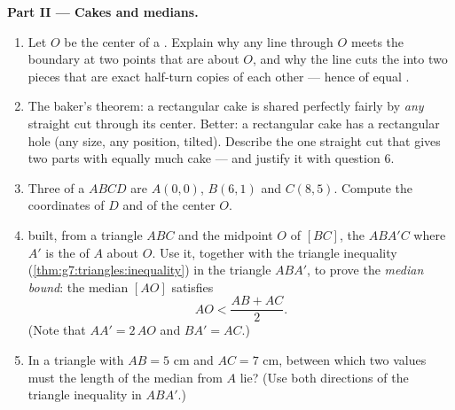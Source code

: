 \begin{problem}
\medskip
\noindent\textbf{Part II --- Cakes and medians.}
\begin{enumerate}[resume]
  \item Let $O$ be the center of a . Explain why
        any line through $O$ meets the boundary at two points
        that are  about $O$, and why the line cuts the
         into two pieces that are exact half-turn
        copies of each other --- hence of equal .
  \item The baker's theorem: a rectangular cake is shared
        perfectly fairly by \emph{any} straight cut through its
        center. Better: a rectangular cake has a rectangular
        hole (any size, any position,  tilted). Describe the
        one straight cut that gives two parts with equally much
        cake --- and justify it with question 6.
  \item Three  of a  $ABCD$ are $A(0, 0)$,
        $B(6, 1)$ and $C(8, 5)$. Compute the coordinates of $D$
        and of the center $O$.
  \item {} built, from a triangle $ABC$
        and the midpoint $O$ of $[BC]$, the 
        $ABA'C$ where $A'$ is the  of $A$ about $O$.
        Use it, together with the triangle inequality
        (\cref{thm:g7:triangles:inequality}) in the triangle
        $ABA'$, to prove the \emph{median bound}: the median
        $[AO]$ satisfies
        \[
        AO < \frac{AB + AC}{2} .
        \]
        (Note that $AA' = 2\,AO$ and $BA' = AC$.)
  \item In a triangle with $AB = 5$ cm and $AC = 7$ cm, between
        which two values must the length of the median from $A$
        lie? (Use both directions of the triangle inequality in
        $ABA'$.)
\end{enumerate}


\end{problem}
